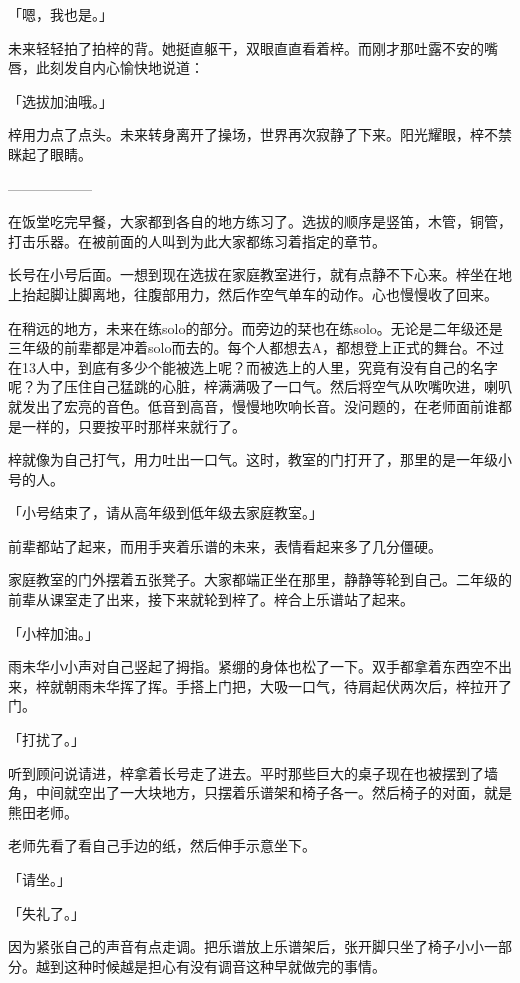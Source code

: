 \documentclass[UTF8]{ctexart}
\begin{document}
    「嗯，我也是。」

    未来轻轻拍了拍梓的背。她挺直躯干，双眼直直看着梓。而刚才那吐露不安的嘴唇，此刻发自内心愉快地说道：

    「选拔加油哦。」

    梓用力点了点头。未来转身离开了操场，世界再次寂静了下来。阳光耀眼，梓不禁眯起了眼睛。

    ——————

    在饭堂吃完早餐，大家都到各自的地方练习了。选拔的顺序是竖笛，木管，铜管，打击乐器。在被前面的人叫到为此大家都练习着指定的章节。

    长号在小号后面。一想到现在选拔在家庭教室进行，就有点静不下心来。梓坐在地上抬起脚让脚离地，往腹部用力，然后作空气单车的动作。心也慢慢收了回来。

    在稍远的地方，未来在练solo的部分。而旁边的栞也在练solo。无论是二年级还是三年级的前辈都是冲着solo而去的。每个人都想去A，都想登上正式的舞台。不过在13人中，到底有多少个能被选上呢？而被选上的人里，究竟有没有自己的名字呢？为了压住自己猛跳的心脏，梓满满吸了一口气。然后将空气从吹嘴吹进，喇叭就发出了宏亮的音色。低音到高音，慢慢地吹响长音。没问题的，在老师面前谁都是一样的，只要按平时那样来就行了。

    梓就像为自己打气，用力吐出一口气。这时，教室的门打开了，那里的是一年级小号的人。

    「小号结束了，请从高年级到低年级去家庭教室。」

    前辈都站了起来，而用手夹着乐谱的未来，表情看起来多了几分僵硬。

    家庭教室的门外摆着五张凳子。大家都端正坐在那里，静静等轮到自己。二年级的前辈从课室走了出来，接下来就轮到梓了。梓合上乐谱站了起来。

    「小梓加油。」

    雨未华小小声对自己竖起了拇指。紧绷的身体也松了一下。双手都拿着东西空不出来，梓就朝雨未华挥了挥。手搭上门把，大吸一口气，待肩起伏两次后，梓拉开了门。

    「打扰了。」

    听到顾问说请进，梓拿着长号走了进去。平时那些巨大的桌子现在也被摆到了墙角，中间就空出了一大块地方，只摆着乐谱架和椅子各一。然后椅子的对面，就是熊田老师。

    老师先看了看自己手边的纸，然后伸手示意坐下。

    「请坐。」

    「失礼了。」

    因为紧张自己的声音有点走调。把乐谱放上乐谱架后，张开脚只坐了椅子小小一部分。越到这种时候越是担心有没有调音这种早就做完的事情。
\end{document}
